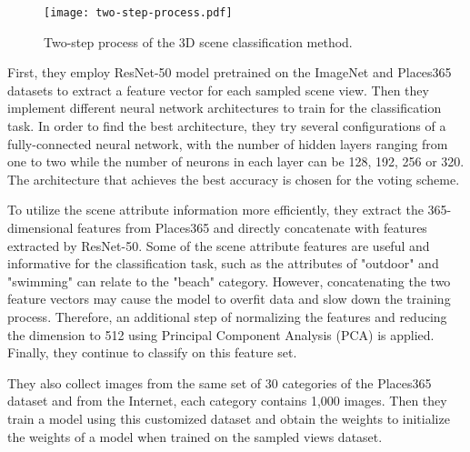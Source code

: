 \documentclass[../main.tex]{subfiles}
\begin{document}
	\begin{figure}
		\centering
		\texttt{[image: two-step-process.pdf]}
		\caption{Two-step process of the 3D scene classification method.}
		\label{fig:3D overview}
	\end{figure}
	
	First, they employ ResNet-50\cite{resnet} model pretrained on the  
	ImageNet\cite{ImageNet} and Places365\cite{zhou2017places} datasets to 
	extract a feature vector for each sampled scene view. Then they implement 
	different neural network architectures to train for the classification 
	task. In order to find the best architecture, they try several 
	configurations of a fully-connected neural network, with the number of 
	hidden layers ranging from one to two while the number of neurons in each 
	layer can be 128, 192, 256 or 320. The architecture that achieves 
	the best accuracy is chosen for the voting scheme.
	
	To utilize the scene attribute information more efficiently, they extract 
	the 365-dimensional features from Places365 and directly concatenate with 
	features extracted by ResNet-50. Some of the scene attribute features are 
	useful and informative for the classification task, such as the attributes 
	of "outdoor" and "swimming" can relate to the "beach" category. However, 
	concatenating the two feature vectors may cause the model to overfit data 
	and slow down the training process. Therefore, an additional step of 
	normalizing the features and reducing the dimension to 512 using Principal 
	Component Analysis (PCA) is applied. Finally, they continue to classify on 
	this feature set.
	
	They also collect images from the same set of 30 categories of the 
	Places365 dataset and from the Internet, each category contains 1,000 
	images. Then they train a model using this customized dataset and obtain 
	the weights to initialize the weights of a model when trained on the 
	sampled views dataset.
	
\end{document}
